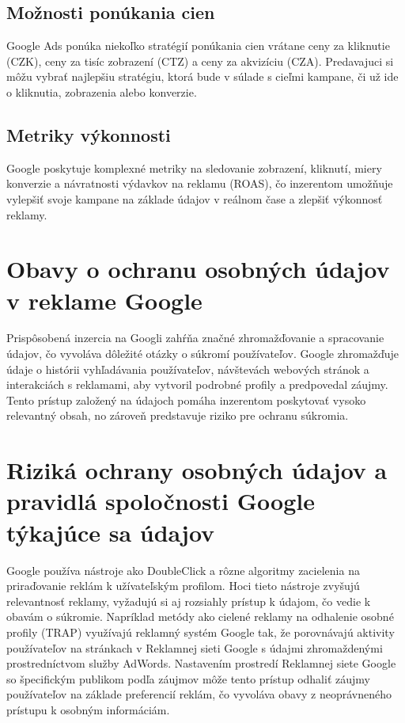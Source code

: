 \documentclass[10pt,slovak,a4paper]{article}
\begin{document}
\subsection{Možnosti ponúkania cien}
Google Ads ponúka niekoľko stratégií ponúkania cien vrátane ceny za kliknutie (CZK), ceny za tisíc zobrazení (CTZ) a 
ceny za akvizíciu (CZA). Predavajuci si môžu vybrať najlepšiu stratégiu, ktorá bude v súlade s cieľmi kampane, či už ide 
o kliknutia, zobrazenia alebo konverzie.\cite{10574622}
\subsection{Metriky výkonnosti}
Google poskytuje komplexné metriky na sledovanie zobrazení, kliknutí, miery konverzie a návratnosti výdavkov na reklamu
 (ROAS), čo inzerentom umožňuje vylepšiť svoje kampane na základe údajov v reálnom čase a zlepšiť výkonnosť reklamy.

\section{Obavy o ochranu osobných údajov v reklame Google}
Prispôsobená inzercia na Googli zahŕňa značné zhromažďovanie a spracovanie údajov, čo vyvoláva dôležité otázky o 
súkromí používateľov. Google zhromažďuje údaje o histórii vyhľadávania používateľov, návštevách webových stránok a 
interakciách s reklamami, aby vytvoril podrobné profily a predpovedal záujmy. Tento prístup založený na údajoch pomáha 
inzerentom poskytovať vysoko relevantný obsah, no zároveň predstavuje riziko pre ochranu súkromia.\cite{7368607}

\section{Riziká ochrany osobných údajov a pravidlá spoločnosti Google týkajúce sa údajov}
Google používa nástroje ako DoubleClick a rôzne algoritmy zacielenia na priraďovanie reklám k užívateľským profilom. 
Hoci tieto nástroje zvyšujú relevantnosť reklamy, vyžadujú si aj rozsiahly prístup k údajom, čo vedie k obavám o 
súkromie. Napríklad metódy ako cielené reklamy na odhalenie osobné profily (TRAP) využívajú reklamný systém Google 
tak, že porovnávajú aktivity používateľov na stránkach v Reklamnej sieti Google s údajmi zhromaždenými prostredníctvom 
služby AdWords. Nastavením prostredí Reklamnej siete Google so špecifickým publikom podľa záujmov môže tento prístup 
odhaliť záujmy používateľov na základe preferencií reklám, čo vyvoláva obavy z neoprávneného prístupu k osobným 
informáciám.\cite{8526633}
\end{document}
